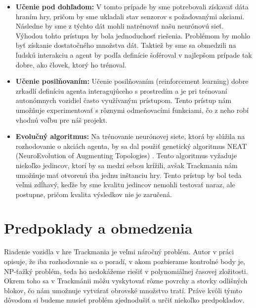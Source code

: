 \begin{itemize}
    \item {\textbf{Učenie pod dohľadom: }
        V tomto prípade by sme potrebovali získavať dáta hraním hry, pričom by sme ukladali stav senzorov s požadovanými akciami. Následne by sme z týchto dát mohli natrénovať našu neurónovú sieť. Výhodou tohto prístupu by bola jednoduchosť riešenia. Problémom by mohlo byť získanie dostatočného množstva dát. Taktiež by sme sa obmedzili na ľudskú interakciu a agent by podľa definície šoféroval v najlepšom prípade tak dobre, ako človek, ktorý ho trénoval.
    }

    \item {\textbf{Učenie posilňovaním:} Učenie posilňovaním (reinforcement learning) dobre zrkadlí definíciu agenta interagujúceho s prostredím a je pri trénovaní autonómnych vozidiel často využívaným prístupom. Tento prístup nám umožňuje experimentovať s rôznymi odmeňovacími funkciami, čo z neho robí vhodnú voľbu pre náš projekt.}

    \item {\textbf{Evolučný algoritmus:} Na trénovanie neurónovej siete, ktorá by slúžila na rozhodovanie o akciách agenta, by sa dal použiť genetický algoritmus NEAT (NeuroEvolution of Augmenting Topologies) \cite{neat_article}. Tento algoritmus vyžaduje niekoľko jedincov, ktorí by sa medzi sebou krížili, avšak Trackmania nám umožňuje mať otvorenú iba jednu inštanciu hry. Tento prístup by bol teda veľmi zdĺhavý, keďže by sme kvalitu jedincov nemohli testovať naraz, ale postupne, pričom kvalita výsledkov nie je zaručená.}

\end{itemize}

\section{Predpoklady a obmedzenia}

Riadenie vozidla v hre Trackmania je veľmi náročný problém. Autor v práci \cite{trackmania_is_np}
opisuje, že iba rozhodovanie sa o poradí, v akom pozbierame kontrolné body je, NP-ťažký problém, teda ho nedokážeme riešiť v polynomiálnej časovej zložitosti. Okrem toho sa v Trackmánii môžu vyskytovať rôzne povrchy a stovky odlišných blokov, čo nám umožnuje vytvárať obrovské množstvo tratí. Práve kvôli týmto dôvodom si budeme musieť problém zjednodušiť a určiť niekoľko predpokladov.


